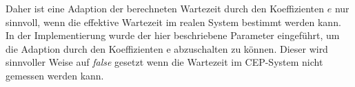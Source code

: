 Daher ist eine Adaption der berechneten Wartezeit durch den Koeffizienten \(e\) nur sinnvoll, wenn die effektive Wartezeit im realen System bestimmt werden kann.
In der Implementierung wurde der hier beschriebene Parameter eingeführt, um die Adaption durch den Koeffizienten e abzuschalten zu können.
Dieser wird sinnvoller Weise auf \textit{false} gesetzt wenn die Wartezeit im CEP-System nicht gemessen werden kann.


















